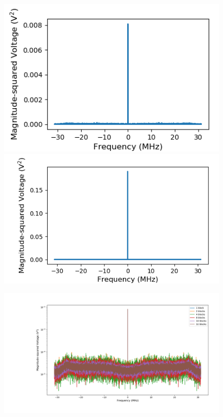 \documentclass[a4paper]{article}
\begin{document}
\begin{figure}
\centering
\begin{minipage}{.5\textwidth}
	\centering
	\includegraphics[width=.9\linewidth]{5-7/pow1}
	\caption{}
	\label{fig:pow1}
\end{minipage}%
\begin{minipage}{.5\textwidth}
	\centering
	\includegraphics[width=.9\linewidth]{5-7/pow_all}
	\caption{}
	\label{fig:pow_all}
\end{minipage}
\end{figure}

\begin{figure}
\centering
\includegraphics[width=\linewidth]{5-7/comparison}
\caption{}
\label{fig:avgs_comparison}
\end{figure}
\end{document}
